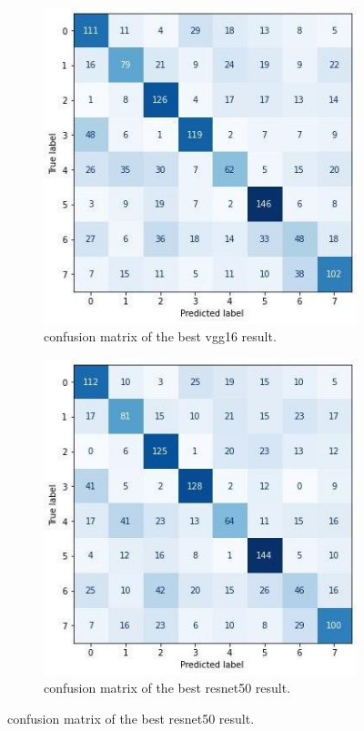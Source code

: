 \begin{figure}
    \begin{subfigure}[c]{0.475\textwidth}
        \centering
        \includegraphics[width=\textwidth]{images/best_vgg16_svmrbf.jpg}
        \caption{confusion matrix of the best vgg16 result.}
        \label{fig:best_vgg16_svmrbf_cm}
    \end{subfigure}
    \hfill
    \begin{subfigure}[c]{0.475\textwidth}
        \centering
        \includegraphics[width=\textwidth]{images/best_resnet50_svmrbf.jpg}
        \caption{confusion matrix of the best resnet50 result.}
        \label{fig:best_resnet50_svmrbf_cm}
    \end{subfigure}
\end{figure}

